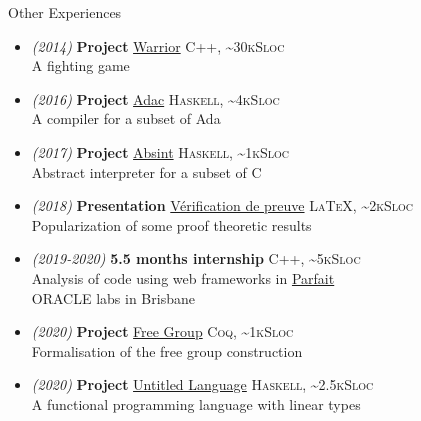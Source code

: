 \documentclass[a4paper,11pt]{extarticle}
\newcommand{\cvtitle}[1]{
    \begin{tcolorbox}[colback=bgcol,colframe=ForestGreen,
        height=1cm, valign=center, sharp corners=downhill]
        {\Large #1}
    \end{tcolorbox}
}
\newcommand{\lang}[2]{\hfill \textsc{\scriptsize #1, \textasciitilde#2Sloc}}
\begin{document}
\begin{minipage}[c][282mm][t]{0.60\linewidth}
        \cvtitle{Other Experiences}

        \begin{itemize}
          \item \emph{\small (2014)} \textbf{Project} \href{https://github.com/DWARVES/Project-Warrior}{Warrior}
                \lang{C++}{30k}\\
                A fighting game
          \item \emph{\small (2016)} \textbf{Project} \href{https://github.com/TWal/ENS\_Adac}{Adac}
                \lang{Haskell}{4k}\\
                A compiler for a subset of Ada
          \item \emph{\small (2017)} \textbf{Project} \href{https://github.com/lucas8/absint}{Absint}
                \lang{Haskell}{1k}\\
                Abstract interpreter for a subset of C
          \item \emph{\small (2018)} \textbf{Presentation} \href{https://sapt.fr/exposes/verification-automatique-de-preuves-884}{Vérification de preuve}
                \lang{\LaTeX}{2k}\\
                Popularization of some proof theoretic results
          \item \emph{\small (2019-2020)} \textbf{5.5 months internship}
                \lang{C++}{5k}\\
                Analysis of code using web frameworks in \href{https://labs.oracle.com/pls/apex/f?p=LABS:project_details:0:13}{Parfait}\\
                ORACLE labs in Brisbane
          \item \emph{\small (2020)} \textbf{Project} \href{https://github.com/dwarfmaster/free_group_coq}{Free Group}
                \lang{Coq}{1k}\\
                Formalisation of the free group construction
          \item \emph{\small (2020)} \textbf{Project} \href{https://github.com/math-fehr/Untitled-Language}{Untitled Language}
                \lang{Haskell}{2.5k}\\
                A functional programming language with linear types
        \end{itemize}

    \end{minipage}
\end{document}
